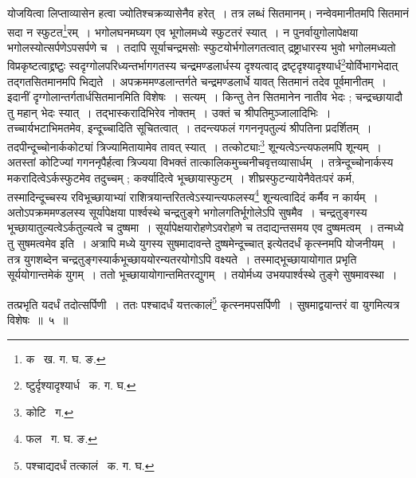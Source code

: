 \documentclass[11pt, openany]{book}
\begin{document}
\noindent योजयित्वा लिप्ताव्यासेन हत्वा ज्योतिश्चक्रव्यासेनैव हरेत्~। तत्र लब्धं सितमानम्। नन्वेवमानीतमपि सितमानं सदा न 
स्फुटत\renewcommand{\thefootnote}{१}\footnote{क \textendash\ ख. ग. घ. ङ.}रम्~। भगोलघनमघ्यग एव भूगोलमध्ये स्फुटतरं स्यात्~। न पुनर्वायुगोलापेक्षया भगोलस्योत्सर्पणेऽपसर्पणे च~। तदापि सूर्याचन्द्रमसोः स्फुटयोर्भगोलगतत्वात् द्रष्ट्राधारस्य भुवो भगोलमध्यतो विप्रकृष्टत्वाद्द्रष्टुः स्वदृग्गोलपरिध्यन्तर्भागगतस्य चन्द्रमण्डलार्धस्य दृश्यत्वाद्
द्रष्टृदृश्यादृश्यार्ध\renewcommand{\thefootnote}{२}\footnote{ष्टुर्दृश्यादृश्यार्ध \textendash\ क. ग. घ.}योर्विभागभेदात् तद्गतसितमानमपि भिद्यते~। अपक्रममण्डलान्तर्गते चन्द्रमण्डलार्धे यावत् सितमानं तदेव पूर्वमानीतम्~। इदानीं दृग्गोलान्तर्गतार्धसितमानमिति विशेषः~। सत्यम्~। किन्तु तेन सितमानेन नातीव भेदः ; चन्द्रच्छायादौ तु महान् भेदः स्यात्~। तद्भास्करादिभिरेव नोक्तम्~। उक्तं च श्रीपतिमुञ्जालादिभिः~। तच्चार्यभटाभिमतमेव, इन्दूच्चादिति सूचितत्वात्~। तदन्त्यफलं गगननृपतुल्यं श्रीपतिना प्रदर्शितम्~। तदपीन्दूच्चोनार्ककोट्यां त्रिज्यामितायामेव तावत् स्यात्~। तत्कोट्याः\renewcommand{\thefootnote}{३}\footnote{कोटि \textendash\ ग.} शून्यत्वेऽन्त्यफलमपि शून्यम्~। अतस्तां कोटिज्यां गगननृपैर्हत्वा त्रिज्यया विभक्तं तात्कालिकमुच्चनीचवृत्तव्यासार्धम्~। तत्रेन्दूच्चोनार्कस्य मकरादित्वेऽर्कस्फुटमेव तदुच्चम् ; कर्क्यादित्वे भूच्छायास्फुटम्~। शीघ्रस्फुटन्यायेनैवेतःपरं कर्म, तस्मादिन्दूच्चस्य रविभूच्छायाभ्यां
राशित्रयान्तरितत्वेऽस्यान्त्यफलस्य\renewcommand{\thefootnote}{४}\footnote{फल \textendash\ ग. घ. ङ.} शून्यत्वादिदं कर्मैव न कार्यम्~। अतोऽपक्रममण्डलस्य सूर्यापेक्षया पार्श्वस्थे चन्द्रतुङ्गे भगोलगतिर्भूगोलेऽपि सुषमैव~। चन्द्रतुङ्गस्य भूच्छायातुल्यत्वेऽर्कतुल्यत्वे च दुष्षमा~। सूर्यापेक्षयारोहणेऽवरोहणे च तदाद्यन्तसमय एव दुष्षमत्वम्~। तन्मध्ये तु सुषमत्वमेव इति~। अत्रापि {\qt मध्ये युगस्य सुषमादावन्ते दुष्षमेन्दूच्चात्} इत्येतदर्धं कृत्स्नमपि योजनीयम्~। तत्र युगशब्देन चन्द्रतुङ्गस्यार्कभूच्छाययोरन्यतरयोगोऽपि वक्ष्यते~। तस्माद्भूच्छायायोगात प्रभृति सूर्ययोगान्तमेकं युगम्~। ततो भूच्छायायोगान्तमितरद्युगम्~। तयोर्मध्य उभयपार्श्वस्थे तुङ्गे सुषमावस्था~। 

\newpage

\noindent तत्प्रभृति यदर्धं तदोत्सर्पिणी~। ततः पश्चादर्धं यत्तत्कालं\renewcommand{\thefootnote}{१}\footnote{पश्चाद्यदर्धं तत्कालं \textendash\ क. ग. घ.} कृत्स्नमपसर्पिणी~। सुषमाद्वयान्तरं वा युगमित्यत्र विशेषः~॥~५~॥ \\
\end{document}
